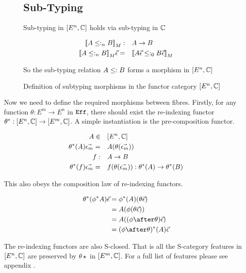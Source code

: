 \documentclass{Report}
\begin{document}
\begin{figure}
    \begin{framed}
        
\subsection{Sub-Typing}
Sub-typing in $[E^n, \mathbb{C}]$ holds via sub-typing in $\mathbb{C}$

\begin{align}
    {\bf [\![}A\leq:_n B{\bf ]\!]}_M:&\quad A\rightarrow B\\
    {\bf [\![}A\leq:_n B{\bf ]\!]}_M\vec{\epsilon}=&\quad {\bf [\![}A\vec{\epsilon}\leq:_0 B\vec{\epsilon}{\bf ]\!]}_M
\end{align}

So the sub-typing relation $A \leq: B$ forms a morphism in $[E^n, \mathbb{C}]$

    \end{framed}
    \caption{Definition of subtyping morphisms in the functor category $[E^n, \mathbb{C}]$}
    \label{HowToBuildSubtyping}
\end{figure}

Now we need to define the required morphisms between fibres. Firstly, for any function 
$\theta: E^m \rightarrow E^n$ in $\texttt{Eff}$, there should exist the re-indexing functor $\theta^*: [E^n, \mathbb{C}] \rightarrow [E^m, \mathbb{C}]$. A simple instantiation is the pre-composition functor.

\begin{align}
    A\in&\quad [E^n, \mathbb{C}]\\
    \theta^*(A) \vec{\epsilon_m} =&\quad  A(\theta(\vec{\epsilon_m}))\\
    f:&\quad A \rightarrow B\\
    \theta^*(f) \vec{\epsilon_m} =&\quad f(\theta(\vec{\epsilon_m})): \theta^*(A) \rightarrow \theta^*(B)\\
\end{align}

This also obeys the composition law of re-indexing functors.

\begin{align}
    \theta\star(\phi\star A) \ev & = \phi\star(A)(\theta \ev)\\
    & = A(\phi(\theta\ev))\\
    & = A((\phi\after\theta) \ev)\\
    & = (\phi\after\theta)\star(A) \ev
\end{align}

\begin{theorem}
    The re-indexing functors are also S-closed. That is all the S-category features in $[E^n, \mathbb{C}]$ are preserved by $\theta\star$ in $[E^m, \mathbb{C}]$. For a full list of features please see appendix .
\end{theorem}
\end{document}

